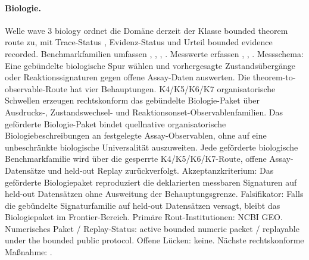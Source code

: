 \paragraph{Biologie.}
Welle wave 3 biology ordnet die Domäne derzeit der Klasse bounded theorem route zu, mit Trace-Status , Evidenz-Status  und Urteil bounded evidence recorded.
Benchmarkfamilien umfassen , \allowbreak {}, \allowbreak {}, \allowbreak {}.
Messwerte erfassen , \allowbreak {}, \allowbreak {}.
Messschema: Eine gebündelte biologische Spur wählen und vorhergesagte Zustandsübergänge oder Reaktionssignaturen gegen offene Assay-Daten auswerten.
Die theorem-to-observable-Route hat vier Behauptungen. K4/K5/K6/K7 organisatorische Schwellen erzeugen rechtskonform das gebündelte Biologie-Paket über Ausdrucks-, Zustandswechsel- und Reaktionsonset-Observablenfamilien. Das geförderte Biologie-Paket bindet quellnative organisatorische Biologiebeschreibungen an festgelegte Assay-Observablen, ohne auf eine unbeschränkte biologische Universalität auszuweiten. Jede geförderte biologische Benchmarkfamilie wird über die gesperrte K4/K5/K6/K7-Route, offene Assay-Datensätze und held-out Replay zurückverfolgt.
Akzeptanzkriterium: Das geförderte Biologiepaket reproduziert die deklarierten messbaren Signaturen auf held-out Datensätzen ohne Ausweitung der Behauptungsgrenze.
Falsifikator: Falls die gebündelte Signaturfamilie auf held-out Datensätzen versagt, bleibt das Biologiepaket im Frontier-Bereich.
Primäre Rout-Institutionen: NCBI GEO.
Numerisches Paket / Replay-Status: active bounded numeric packet / replayable under the bounded public protocol.
Offene Lücken: keine.
Nächste rechtskonforme Maßnahme: .

